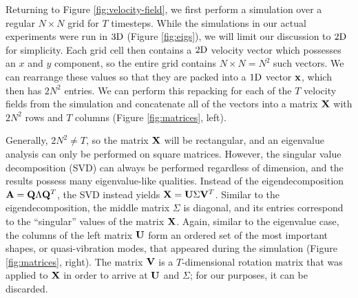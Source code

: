 Returning to Figure \ref{fig:velocity-field}, we first perform a simulation over a regular $N \times N$ grid for $T$ timesteps. While the simulations in our actual experiments were run in $3\textnormal{D}$ (Figure \ref{fig:eigs}), we will limit our discussion to $2\textnormal{D}$ for simplicity. Each grid cell then contains a $2\textnormal{D}$ velocity vector which possesses an $x$ and $y$ component, so the entire grid contains $N \times N = N^2$ such vectors. We can rearrange these values so that they are packed into a $1\textnormal{D}$ vector $\mathbf{x}$, which then has $2N^2$ entries. We can perform this repacking for each of the $T$ velocity fields from the simulation and concatenate all of the vectors into a matrix $\mathbf{X}$ with $2N^2$ rows and $T$ columns (Figure \ref{fig:matrices}, left).

Generally, $2N^2 \neq T$, so the matrix $\mathbf{X}$ will be rectangular, and an eigenvalue analysis can only be performed on square matrices. However, the singular value decomposition (SVD) can always be performed regardless of dimension, and the results possess many eigenvalue-like qualities. Instead of the eigendecomposition $\mathbf{A} = \mathbf{Q} \Lambda \mathbf{Q}^T$, the SVD instead yields $\mathbf{X} = \mathbf{U} \Sigma \mathbf{V}^T$. Similar to the eigendecomposition, the middle matrix $\Sigma$ is diagonal, and its entries correspond to the ``singular'' values of the matrix $\mathbf{X}$. Again, similar to the eigenvalue case, the columns of the left matrix $\mathbf{U}$ form an ordered set of the most important shapes, or quasi-vibration modes, that appeared during the simulation (Figure \ref{fig:matrices}, right). The matrix $\mathbf{V}$ is a $T$-dimensional rotation matrix that was applied to $\mathbf{X}$ in order to arrive at $\mathbf{U}$ and $\Sigma$; for our purposes, it can be discarded.



